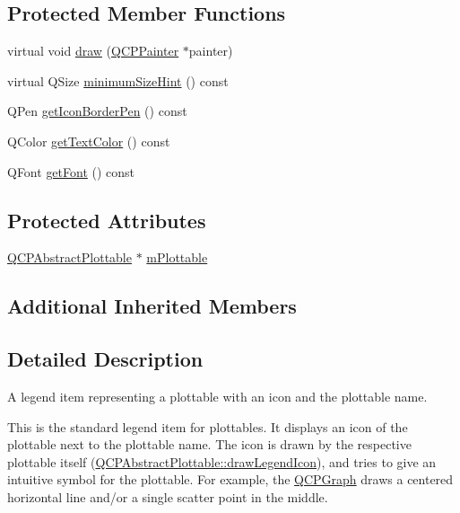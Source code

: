 \subsection*{Protected Member Functions}
\begin{DoxyCompactItemize}
\item 
virtual void \hyperlink{class_q_c_p_plottable_legend_item_a68a781c3de4f9959fdf82075052d43aa}{draw} (\hyperlink{class_q_c_p_painter}{Q\+C\+P\+Painter} $\ast$painter)
\item 
virtual Q\+Size \hyperlink{class_q_c_p_plottable_legend_item_a76bad654ebc8e870392f488419a6a483}{minimum\+Size\+Hint} () const 
\item 
Q\+Pen \hyperlink{class_q_c_p_plottable_legend_item_ab36270e6b022a6961fa44136f35c0e4b}{get\+Icon\+Border\+Pen} () const 
\item 
Q\+Color \hyperlink{class_q_c_p_plottable_legend_item_ad762b07439c738660ba93e78c1d03667}{get\+Text\+Color} () const 
\item 
Q\+Font \hyperlink{class_q_c_p_plottable_legend_item_a8a85c8a25affb4895423d730164d61de}{get\+Font} () const 
\end{DoxyCompactItemize}
\subsection*{Protected Attributes}
\begin{DoxyCompactItemize}
\item 
\hyperlink{class_q_c_p_abstract_plottable}{Q\+C\+P\+Abstract\+Plottable} $\ast$ \hyperlink{class_q_c_p_plottable_legend_item_ada647fb4b22971a1a424e15b4f6af0d9}{m\+Plottable}
\end{DoxyCompactItemize}
\subsection*{Additional Inherited Members}


\subsection{Detailed Description}
A legend item representing a plottable with an icon and the plottable name. 

This is the standard legend item for plottables. It displays an icon of the plottable next to the plottable name. The icon is drawn by the respective plottable itself (\hyperlink{class_q_c_p_abstract_plottable_a9a450783fd9ed539e589999fd390cdf7}{Q\+C\+P\+Abstract\+Plottable\+::draw\+Legend\+Icon}), and tries to give an intuitive symbol for the plottable. For example, the \hyperlink{class_q_c_p_graph}{Q\+C\+P\+Graph} draws a centered horizontal line and/or a single scatter point in the middle.

